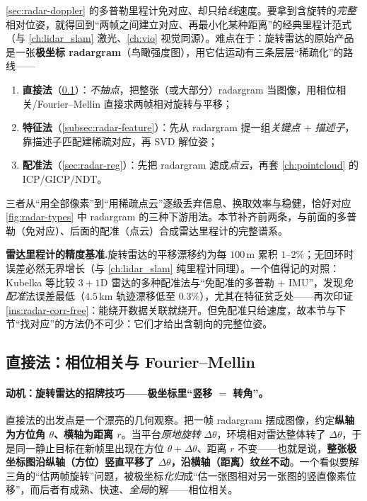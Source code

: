 \cref{sec:radar-doppler} 的多普勒里程计免对应、却只给\emph{线}速度。要拿到含旋转的\emph{完整}相对位姿，就得回到“两帧之间建立对应、再最小化某种距离”的经典里程计范式（与 \cref{ch:lidar_slam} 激光、\cref{ch:vio} 视觉同源）。难点在于：旋转雷达的原始产品是一张\textbf{极坐标 radargram}（鸟瞰强度图），用它估运动有三条层层“稀疏化”的路线\cite{carlone2026handbook}——
\begin{enumerate}
  \item \textbf{直接法}（\cref{subsec:radar-direct}）：\emph{不抽点}，把整张（或大部分）radargram 当图像，用相位相关/Fourier--Mellin 直接求两帧相对旋转与平移；
  \item \textbf{特征法}（\cref{subsec:radar-feature}）：先从 radargram 提一组\emph{关键点 $+$ 描述子}，靠描述子匹配建稀疏对应，再 SVD 解位姿；
  \item \textbf{配准法}（\cref{sec:radar-reg}）：先把 radargram 滤成\emph{点云}，再套 \cref{ch:pointcloud} 的 ICP/GICP/NDT。
\end{enumerate}
三者从“用全部像素”到“用稀疏点云”逐级丢弃信息、换取效率与稳健，恰好对应 \cref{fig:radar-types} 中 radargram 的三种下游用法。本节补齐前两条，与前面的多普勒（免对应）、后面的配准（点云）合成雷达里程计的完整谱系。

\begin{note}
\textbf{雷达里程计的精度基准.}\;旋转雷达的平移漂移约为每 $100$\,m 累积 $1$--$2\%$\cite{carlone2026handbook}；无回环时误差必然无界增长（与 \cref{ch:lidar_slam} 纯里程计同理）。一个值得记的对照：Kubelka 等比较 $3{+}1$D 雷达的多种配准法与“免配准的多普勒 $+$ IMU”，发现\emph{免配准}法误差最低（$4.5$\,km 轨迹漂移低至 $0.3\%$），尤其在特征贫乏处——再次印证 \cref{ins:radar-corr-free}：能绕开数据关联就绕开。但免配准只给速度，故本节与下节“找对应”的方法仍不可少：它们才给出含朝向的完整位姿。
\end{note}

\subsection{直接法：相位相关与 Fourier--Mellin}
\label{subsec:radar-direct}

\paragraph{动机：旋转雷达的招牌技巧——极坐标里“竖移 $=$ 转角”。}
直接法的出发点是一个漂亮的几何观察。把一帧 radargram 摆成图像，约定\textbf{纵轴为方位角 $\theta$、横轴为距离 $r$}。当平台\emph{原地旋转} $\Delta\theta$，环境相对雷达整体转了 $\Delta\theta$，于是同一静止目标在新帧里出现在方位 $\theta+\Delta\theta$、距离 $r$ 不变——也就是说，\textbf{整张极坐标图沿纵轴（方位）竖直平移了 $\Delta\theta$，沿横轴（距离）纹丝不动}\cite{carlone2026handbook}。一个看似要解三角的“估两帧旋转”问题，被极坐标\emph{化归}成“估一张图相对另一张图的竖直像素位移”，而后者有成熟、快速、\emph{全局}的解——相位相关。


